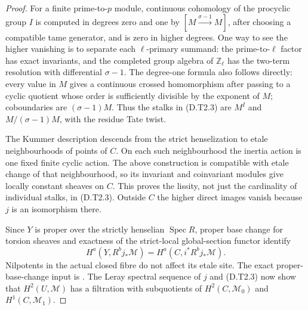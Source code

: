 \begin{proof}
For a finite prime-to-$p$ module, continuous cohomology
of the procyclic group $I$ is computed in degrees zero
and one by $[M\xrightarrow{\sigma-1}M]$, after choosing
a compatible tame generator, and is zero in higher
degrees. One way to see the higher vanishing is to
separate each $\ell$-primary summand: the prime-to-$\ell$
factor has exact invariants, and the completed group
algebra of $\mathbb Z_\ell$ has the two-term resolution
with differential $\sigma-1$. The degree-one formula
also follows directly: every value in $M$ gives a
continuous crossed homomorphism after passing to a
cyclic quotient whose order is sufficiently divisible
by the exponent of $M$; coboundaries are $(\sigma-1)M$.
Thus the stalks in (D.T2.3) are $M^I$ and
$M/(\sigma-1)M$, with the residue Tate twist.

The Kummer description descends from the strict
henselization to etale neighbourhoods of points of $C$.
On each such neighbourhood the inertia action is one
fixed finite cyclic action. The above construction is
compatible with etale change of that neighbourhood,
so its invariant and coinvariant modules give locally
constant sheaves on $C$. This proves the lissity, not
just the cardinality of individual stalks, in (D.T2.3).
Outside $C$ the higher direct images vanish because
$j$ is an isomorphism there.

Since $Y$ is proper over the strictly henselian
$\operatorname{Spec}R$, proper base change for torsion
sheaves and exactness of the strict-local global-section
functor identify
\[
 H^a(Y,R^bj_*\mathcal M)
       =H^a(C,i^*R^bj_*\mathcal M).
                                                        \tag{D.T2.7}
\]
Nilpotents in the actual closed fibre do not affect its
etale site. The exact proper-base-change input is
\citep[Theorem 59.91.11, Tag 095T]{StacksSemilinearDeterminantsB}.
The Leray spectral sequence of $j$ and (D.T2.3) now
show that $H^2(U,\mathcal M)$ has a filtration with
subquotients of $H^2(C,\mathcal M_0)$ and
$H^1(C,\mathcal M_1)$.


\end{proof}
